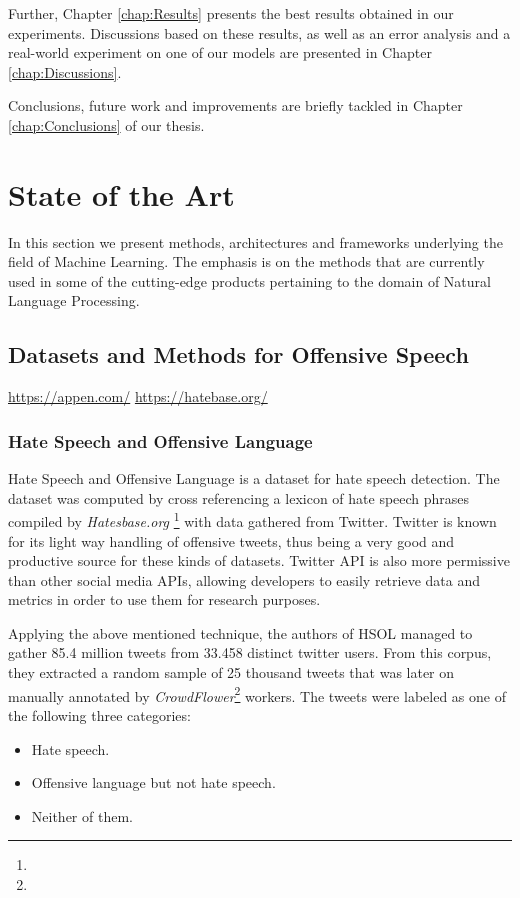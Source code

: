 \documentclass[12pt,a4paper]{report}
\begin{document}
Further, Chapter \ref{chap:Results} presents the best results obtained in our experiments. Discussions based on these results, as well as an error analysis and a real-world experiment on one of our models are presented in Chapter \ref{chap:Discussions}.

Conclusions, future work and improvements are briefly tackled in Chapter \ref{chap:Conclusions} of our thesis.

\chapter{State of the Art}
\label{chap:stateOfTheArt}
In this section we present methods, architectures and frameworks underlying the field of Machine Learning. The emphasis is on the methods that are currently used in some of the cutting-edge products pertaining to the domain of Natural Language Processing.

\section{Datasets and Methods for Offensive Speech}

\urldef{\urlCrowdFlower}\url{https://appen.com/}
\urldef{\urlHatebase}\url{https://hatebase.org/}
\subsection{Hate Speech and Offensive Language}
Hate Speech and Offensive Language \citep{davidson2017automated} is a dataset for hate speech detection. The dataset was computed by cross referencing a lexicon of hate speech phrases compiled by \textit{Hatesbase.org} \footnote{\urlHatebase} with data gathered from Twitter. Twitter is known for its light way handling of offensive tweets, thus being a very good and productive source for these kinds of datasets. Twitter API is also more permissive than other social media APIs, allowing developers to easily retrieve data and metrics in order to use them for research purposes. 

Applying the above mentioned technique, the authors of HSOL managed to gather 85.4 million tweets from 33.458 distinct twitter users. From this corpus, they extracted a random sample of 25 thousand tweets that was later on manually annotated by \textit{CrowdFlower}\footnote{\urlCrowdFlower} workers. The tweets were labeled as one of the following three categories:
\begin{itemize}
    \item Hate speech.
    \item Offensive language but not hate speech.
    \item Neither of them.
\end{itemize}
\end{document}
